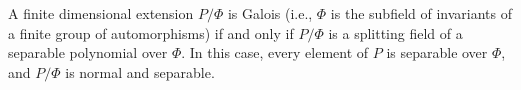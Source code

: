 A finite dimensional extension $P/\Phi$ is Galois (i.e., $\Phi$ is the subfield of invariants of a finite group of automorphisms) if and only if $P/\Phi$ is a splitting field of a separable polynomial over $\Phi$. In this case, every element of $P$ is separable over $\Phi$, and $P/\Phi$ is normal and separable.
